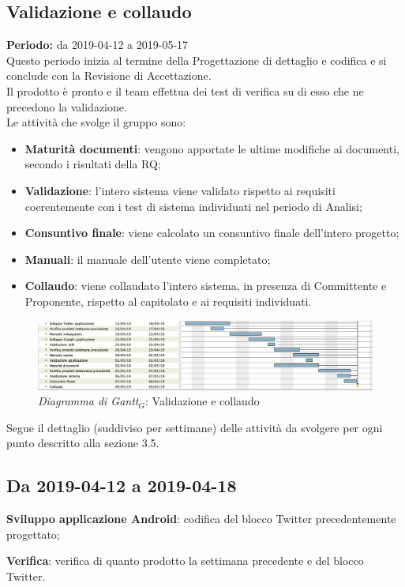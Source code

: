 \begin{flushleft}
\newpage
\section{Validazione e collaudo}\label{pianCollaudo}
\label{Validazione}
\textbf{Periodo:} da 2019-04-12 a 2019-05-17\\
Questo periodo inizia al termine della Progettazione di dettaglio e codifica e si conclude con la Revisione di Accettazione.\\
Il prodotto è pronto e il team effettua dei test di verifica su di esso che ne precedono la validazione.\\
Le attività che svolge il gruppo sono:
\begin{itemize}
   \item \textbf{Maturità documenti}: vengono apportate le ultime modifiche ai documenti, secondo i risultati della RQ;
   \item \textbf{Validazione}: l'intero sistema viene validato rispetto ai requisiti coerentemente con i test di sistema individuati nel periodo di Analisi;
   \item \textbf{Consuntivo finale}: viene calcolato un consuntivo finale dell'intero progetto;
   \item \textbf{Manuali}: il manuale dell'utente viene completato;
   \item \textbf{Collaudo}: viene collaudato l'intero sistema, in presenza di Committente e Proponente, rispetto al capitolato e ai requisiti individuati. 
\end{itemize}
\begin{figure} [h]
    \centering
    \includegraphics[scale=0.29]{./images/ZeroSevenGanttValidazione.png}
    \caption{\textit{Diagramma di Gantt$_{G}$}: Validazione e collaudo }\label{G5}
\end{figure}
Segue il dettaglio (suddiviso per settimane) delle attività da svolgere per ogni punto descritto alla sezione 3.5.
\subsection{Da 2019-04-12 a 2019-04-18}
	\item \textbf{Sviluppo applicazione Android}: codifica del blocco Twitter precedentemente progettato;
	\item \textbf{Verifica}: verifica di quanto prodotto la settimana precedente e del blocco Twitter.

\end{flushleft}
